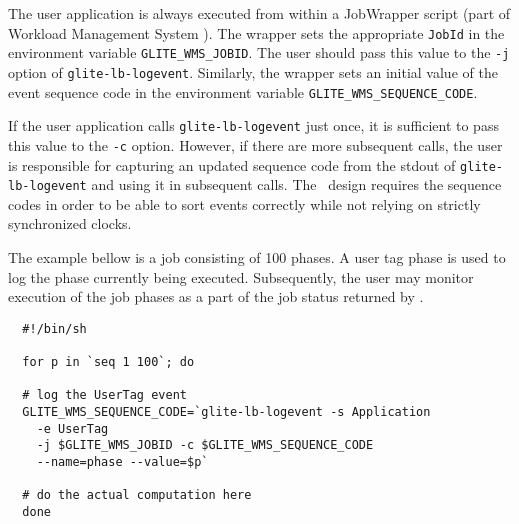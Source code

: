 The user application is always executed from within a JobWrapper script (part
of Workload Management System \cite{jgc}). The wrapper  sets the  appropriate
\verb'JobId' in the environment variable \verb'GLITE_WMS_JOBID'. The user
should pass this value to the \verb'-j' option of \verb'glite-lb-logevent'.
Similarly, the wrapper sets an initial value of the event sequence code in the
environment variable \verb'GLITE_WMS_SEQUENCE_CODE'.

If the user application calls \verb'glite-lb-logevent' just once, it is
sufficient to pass this value to the \verb'-c' option.  However, if there are
more  subsequent calls,  the  user is responsible for capturing an updated
sequence code from the stdout of \verb'glite-lb-logevent' and using it in
subsequent calls. The \LB\ design requires the sequence codes in  order  to be
able to sort events correctly while not relying on strictly synchronized
clocks.

The example bellow is a job consisting of 100 phases. A user tag phase is used
to log the phase currently being executed. Subsequently, the user may monitor
execution of the job phases as a part of the job status returned by \LB.

\begin{verbatim}
  #!/bin/sh

  for p in `seq 1 100`; do

  # log the UserTag event
  GLITE_WMS_SEQUENCE_CODE=`glite-lb-logevent -s Application
    -e UserTag
    -j $GLITE_WMS_JOBID -c $GLITE_WMS_SEQUENCE_CODE
    --name=phase --value=$p`

  # do the actual computation here
  done
\end{verbatim}
